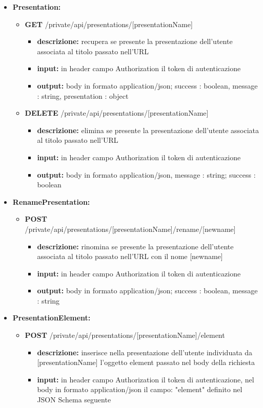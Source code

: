 {{\begin{itemize}
			
		\item \textbf{Presentation:}
			\begin{itemize}
			\item  \textbf{GET} /private/api/presentations/[presentationName]
				\begin{itemize} 
				\item \textbf{descrizione:} recupera se presente la presentazione dell'utente associata al titolo passato nell'URL
				\item \textbf{input:} in header campo Authorization il token di autenticazione
				\item \textbf{output:} body in formato application/json; success : boolean, message : string, presentation : object
				\end{itemize}
				
			\item  \textbf{DELETE} /private/api/presentations/[presentationName]
				\begin{itemize} 
				\item \textbf{descrizione:} elimina se presente la presentazione dell'utente associata al titolo passato nell'URL
				\item \textbf{input:} in header campo Authorization il token di autenticazione
				\item \textbf{output:} body in formato application/json, message : string; success : boolean
				\end{itemize}
			\end{itemize}

		\item \textbf{RenamePresentation:}
			\begin{itemize}
			\item  \textbf{POST} /private/api/presentations/[presentationName]/rename/[newname] 
				\begin{itemize} 
				\item \textbf{descrizione:} rinomina se presente la presentazione dell'utente associata al titolo passato nell'URL con il nome [newname]
				\item \textbf{input:} in header campo Authorization il token di autenticazione
				\item \textbf{output:} body in formato application/json; success : boolean, message : string
				\end{itemize}
			\end{itemize}
			
		\item \textbf{PresentationElement:}
			\begin{itemize}
			\item   \textbf{POST} /private/api/presentations/[presentationName]/element
				\begin{itemize} 
				\item \textbf{descrizione:} inserisce nella presentazione dell'utente individuata da [presentationName] l'oggetto element passato nel body della richiesta
				\item \textbf{input:} in header campo Authorization il token di autenticazione, nel body in formato application/json il campo: "element" definito nel JSON Schema seguente
				

\end{itemize}
\end{itemize}
\end{itemize}}}
